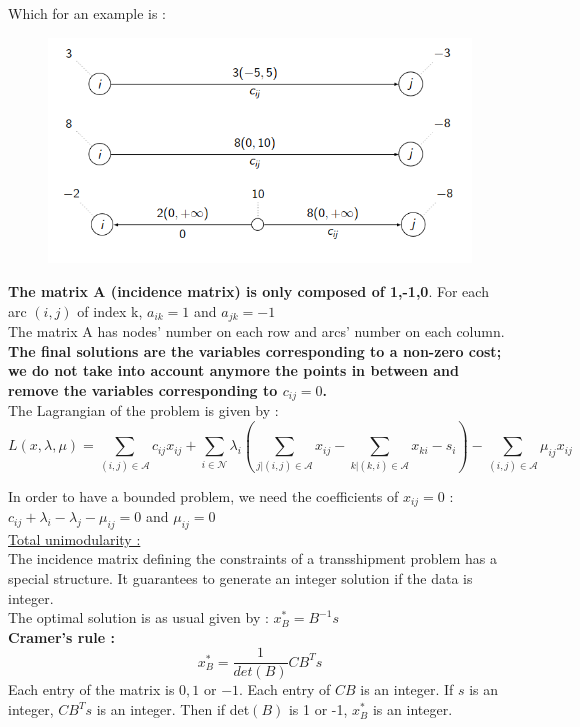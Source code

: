 \documentclass[../main.tex]{subfiles}
\begin{document}
Which for an example is : 
\\
\begin{figure}[hbt!]
    \centering
    \includegraphics[width=.6\textwidth]{IMAGES/opti/Screenshot from 2024-01-13 21-57-11.png}
\end{figure}


\textbf{The matrix A (incidence matrix) is only composed of 1,-1,0}. For each arc $(i,j)$ of index k, $a_{ik}=1$ and $a_{jk} = -1$\\
The matrix A has nodes' number on each row and arcs' number on each column.\\

\warning \textbf{The final solutions are the variables corresponding to a non-zero cost; we do not take into account anymore the points in between and remove the variables corresponding to $c_{ij}=0$.}\\

The Lagrangian of the problem is given by : \begin{equation}
    L(x,\lambda,\mu) = \sum_{(i,j)\in \mathcal{A}} c_{ij}x_{ij} + \sum_{i\in \mathcal{N}} \lambda_i(\sum_{j\lvert (i,j) \in \mathcal{A}} x_{ij} - \sum_{k\lvert (k,i) \in \mathcal{A}} x_{ki} - s_i) - \sum_{(i,j)\in \mathcal{A}} \mu_{ij} x_{ij}
\end{equation}

In order to have a bounded problem, we need the coefficients of $x_{ij} = 0$ : $c_{ij} + \lambda_i - \lambda_j - \mu_{ij} = 0$ and $\mu_{ij} = 0$\\

\quad \underline{Total unimodularity :}\\
The incidence matrix defining the constraints of a transshipment problem has a special structure. It guarantees to generate an integer solution if the data is integer.\\

The optimal solution is as usual given by : $x_B^* = B^{-1}s$\\

\textbf{Cramer's rule :} \begin{equation}
    x_B^* = \frac{1}{det(B)}C B^Ts
\end{equation}
Each entry of the matrix is $0,1$ or $-1$. Each entry of $CB$ is an integer. If $s$ is an integer, $CB^Ts$ is an integer. Then if det$(B)$ is 1 or -1, $x_B^*$ is an integer.\\
\end{document}
